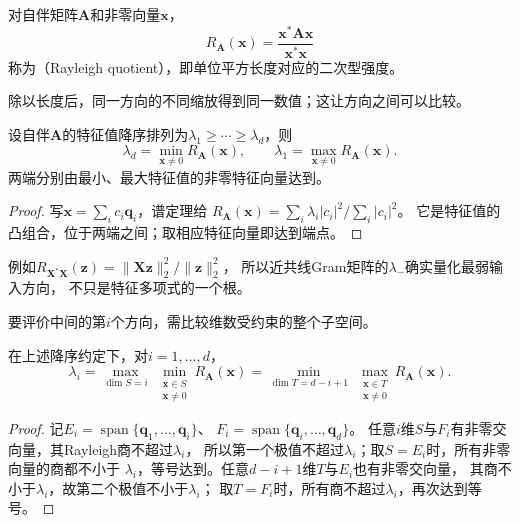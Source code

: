 \begin{definition}[Rayleigh商]
\label{def:matrix-analysis-rayleigh-quotient}
对自伴矩阵$\bm A$和非零向量$\bm x$，
\begin{equation}
 R_{\bm A}(\bm x)=\frac{\bm x^*\bm A\bm x}{\bm x^*\bm x}
 \label{eq:matrix-analysis-rayleigh-quotient}
\end{equation}
称为（Rayleigh quotient），即单位平方长度对应的二次型强度。
\end{definition}
除以长度后，同一方向的不同缩放得到同一数值；这让方向之间可以比较。
\begin{theorem}
\label{thm:matrix-analysis-rayleigh-ritz}
设自伴$\bm A$的特征值降序排列为$\lambda_1\geq\cdots\geq\lambda_d$，则
\begin{equation}
 \lambda_d=\min_{\bm x\neq0}R_{\bm A}(\bm x),\qquad
 \lambda_1=\max_{\bm x\neq0}R_{\bm A}(\bm x).
 \label{eq:matrix-analysis-rayleigh-ritz}
\end{equation}
两端分别由最小、最大特征值的非零特征向量达到。
\end{theorem}
\begin{proof}
写$\bm x=\sum_i c_i\bm q_i$，谱定理给
$R_{\bm A}(\bm x)=\sum_i\lambda_i|c_i|^2/\sum_i|c_i|^2$。
它是特征值的凸组合，位于两端之间；取相应特征向量即达到端点。
\end{proof}
例如$R_{\bm X^*\bm X}(\bm z)=
\lVert\bm X\bm z\rVert_2^2/\lVert\bm z\rVert_2^2$，
所以近共线Gram矩阵的$\lambda_-$确实量化最弱输入方向，
不只是特征多项式的一个根。

要评价中间的第$i$个方向，需比较维数受约束的整个子空间。
\begin{theorem}
\label{thm:matrix-analysis-courant-fischer}
在上述降序约定下，对$i=1,\ldots,d$，
\begin{equation}
 \lambda_i
 =\max_{\dim S=i}\ \min_{\substack{\bm x\in S\\\bm x\neq0}}R_{\bm A}(\bm x)
 =\min_{\dim T=d-i+1}\ \max_{\substack{\bm x\in T\\\bm x\neq0}}R_{\bm A}(\bm x).
 \label{eq:matrix-analysis-courant-fischer}
\end{equation}
\end{theorem}
\begin{proof}
记$E_i=\operatorname{span}\{\bm q_1,\ldots,\bm q_i\}$、
$F_i=\operatorname{span}\{\bm q_i,\ldots,\bm q_d\}$。
任意$i$维$S$与$F_i$有非零交向量，其Rayleigh商不超过$\lambda_i$，
所以第一个极值不超过$\lambda_i$；取$S=E_i$时，所有非零向量的商都不小于
$\lambda_i$，等号达到。任意$d-i+1$维$T$与$E_i$也有非零交向量，
其商不小于$\lambda_i$，故第二个极值不小于$\lambda_i$；
取$T=F_i$时，所有商不超过$\lambda_i$，再次达到等号。
\end{proof}

